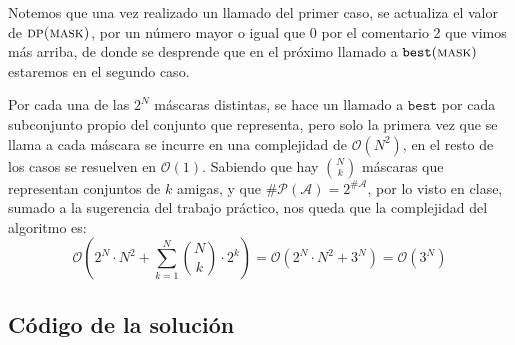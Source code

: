 	Notemos que una vez realizado un llamado del primer caso, se actualiza el valor de $\textsc{dp(mask)}$, por un número mayor o igual que $0$ por el comentario 2 que vimos más arriba, de donde se desprende que en el próximo llamado a $\texttt{best}(\textsc{mask})$ estaremos en el segundo caso.	
	
	Por cada una de las $2^N$ máscaras distintas, se hace un llamado a $\texttt{best}$ por cada subconjunto propio del conjunto que representa, pero solo la primera vez que se llama a cada máscara se incurre en una complejidad de $\mathcal{O}(N^2)$, en el resto de los casos se resuelven en $\mathcal{O}(1)$. Sabiendo que hay $\binom{N}{k}$ máscaras que representan conjuntos de $k$ amigas, y que $\# \mathcal{P}(\mathcal{A}) = 2^{\# \mathcal{A}}$, por lo visto en clase, sumado a la sugerencia del trabajo práctico, nos queda que la complejidad del algoritmo es:
	$$ \mathcal{O} \left ( 2^N \cdot N^2 + \sum_{k = 1}^N \binom{N}{k} \cdot 2^k \right ) = \mathcal{O}\left (2^N \cdot N^2 + 3^N \right ) = \boxed{ \mathcal{O}(3^N)} $$
	
\subsection{C\'odigo de la soluci\'on}

